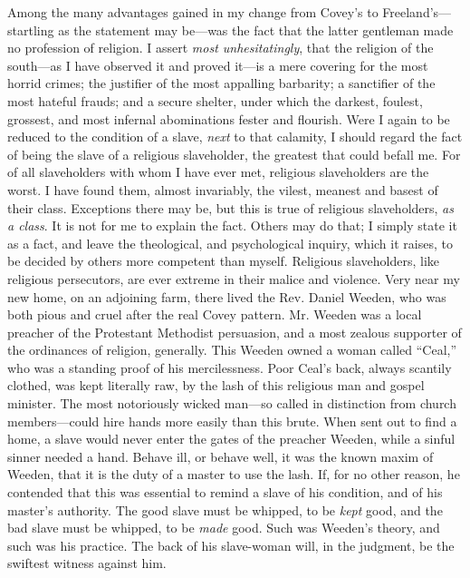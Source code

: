Among the many advantages gained in my change from Covey's to
Freeland's---startling as the statement may be---was the fact that the
latter gentleman made no profession of religion. I assert \emph{most
unhesitatingly}, that the religion of the south---as I have observed it
and proved it---is a mere covering for the most horrid crimes; the
justifier of the most appalling barbarity; a sanctifier of the most
hateful frauds; and a secure shelter, under which the darkest, foulest,
grossest, and most infernal abominations fester and flourish. Were I
again to be reduced to the condition of a slave, \emph{next} to that
calamity, I should regard the fact of being the slave of a religious
slaveholder, the {}greatest that could befall me. For of all
slaveholders with whom I have ever met, religious slaveholders are the
worst. I have found them, almost invariably, the vilest, meanest and
basest of their class. Exceptions there may be, but this is true of
religious slaveholders, \emph{as a class}. It is not for me to explain
the fact. Others may do that; I simply state it as a fact, and leave the
theological, and psychological inquiry, which it raises, to be decided
by others more competent than myself. Religious slaveholders, like
religious persecutors, are ever extreme in their malice and violence.
Very near my new home, on an adjoining farm, there lived the Rev. Daniel
Weeden, who was both pious and cruel after the real Covey pattern. Mr.
Weeden was a local preacher of the Protestant Methodist persuasion, and
a most zealous supporter of the ordinances of religion, generally. This
Weeden owned a woman called ``Ceal,'' who was a standing proof of his
mercilessness. Poor Ceal's back, always scantily clothed, was kept
literally raw, by the lash of this religious man and gospel minister.
The most notoriously wicked man---so called in distinction from church
members---could hire hands more easily than this brute. When sent out to
find a home, a slave would never enter the gates of the preacher Weeden,
while a sinful sinner needed a hand. Behave ill, or behave well, it was
the known maxim of Weeden, that it is the duty of a master to use the
lash. If, for no other reason, he contended that this was essential to
remind a slave of his condition, and of his master's authority. The good
slave must be whipped, to be \emph{kept} good, and the bad slave must be
{}whipped, to be \emph{made} good. Such was Weeden's theory, and such
was his practice. The back of his slave-woman will, in the judgment, be
the swiftest witness against him.

